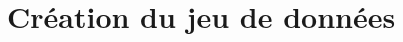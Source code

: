 \documentclass[11pt]{article} %
\begin{document}
\section{Création du jeu de données}



































\printbibliography
\end{document}

